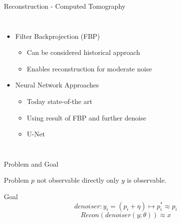 \begin{frame}{Reconstruction -  Computed Tomography}
    \begin{columns}
        
        \begin{itemize}
            \item Filter Backprojection (FBP)
            \begin{itemize}
                \item Can be considered historical approach
                \item Enables reconstruction for moderate noise
            \end{itemize}
            \item<3> Neural Network Approaches
            \begin{itemize}
                \item Today state-of-the art
                \item Using result of FBP and further denoise
                \item U-Net \cite{unet-tomography}
            \end{itemize}
        \end{itemize}


    \end{columns}
\end{frame}



\begin{frame}{Problem and Goal}
    \pause
    \begin{block}{Problem}
        $p$ not observable directly only $y$ is observable.
    \end{block}
    \pause
    \begin{block}{Goal}
        $$ denoiser:   y_i = (p_i + \eta) \mapsto p_i^* \approx p_i $$
        $$ \textit{Recon} \left( denoiser(y; \theta) \right) \approx x $$
    \end{block}

\end{frame}


